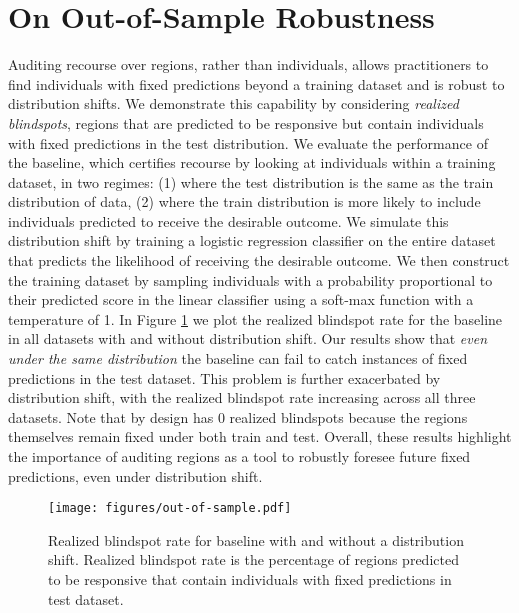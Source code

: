 \section{On Out-of-Sample Robustness} \label{app:distribution_shift}
Auditing recourse over regions, rather than individuals, allows practitioners to find individuals with fixed predictions beyond a training dataset and is robust to distribution shifts. We demonstrate this capability by considering \emph{realized blindspots}, regions that are predicted to be responsive but contain individuals with fixed predictions in the test distribution. We evaluate the performance of the  baseline, which certifies recourse by looking at individuals within a training dataset, in two regimes: (1) where the test distribution is the same as the train distribution of data, (2) where the train distribution is more likely to include individuals predicted to receive the desirable outcome. We simulate this distribution shift by training a logistic regression classifier on the entire dataset that predicts the likelihood of receiving the desirable outcome. We then construct the training dataset by sampling individuals with a probability proportional to their predicted score in the linear classifier using a soft-max function with a temperature of 1. In Figure \ref{fig:outofsample} we plot the realized blindspot rate for the  baseline in all datasets with and without distribution shift. Our results show that \emph{even under the same distribution} the  baseline can fail to catch instances of fixed predictions in the test dataset. This problem is further exacerbated by distribution shift, with the realized blindspot rate increasing across all three datasets. Note that by design \us{} has 0 realized blindspots because the regions themselves remain fixed under both train and test. Overall, these results highlight the importance of auditing regions as a tool to robustly foresee future fixed predictions, even under distribution shift.

\begin{figure}[ht]
      \centering
      \texttt{[image: figures/out-of-sample.pdf]}
  \caption {\label{fig:outofsample}  Realized blindspot rate for  baseline with and without a distribution shift. Realized blindspot rate is the percentage of regions predicted to be responsive that contain individuals with fixed predictions in test dataset.}
\end{figure}

